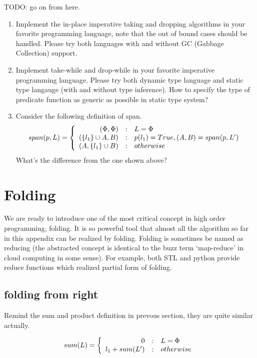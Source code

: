 \documentclass{article}
\begin{document}
TODO: go on from here.

\begin{Exercise}
\begin{enumerate}
\item Implement the in-place imperative taking and dropping algorithms in your favorite programming language, note that
the out of bound cases should be handled. Please try both languages with and without GC (Gabbage Collection) support.
\item Implement take-while and drop-while in your favorite imperative programming language. Please try both dynamic
type language and static type langauge (with and without type inference). How to specify the type of predicate function
as generic as possible in static type system?
\item Consider the following definition of span.
\[
span(p, L) =  \left \{
  \begin{array}
  {r@{\quad:\quad}l}
  (\Phi, \Phi) & L = \Phi \\
  (\{ l_1 \} \cup A, B) & p(l_1) = True, (A, B) = span(p, L') \\
  (A, \{l_1\} \cup B) & otherwise
  \end{array}
\right.
\]
What's the difference from the one shown above?
\end{enumerate}
\end{Exercise}

\section{Folding}

We are ready to introduce one of the most critical concept in high order programming, folding. It is so powerful tool
that almost all the algorithm so far in this appendix can be realized by folding. Folding is sometimes be named as
reducing (the abstracted concept is identical to the buzz term `map-reduce' in cloud computing in some sense). For example,
both STL and python provide reduce functions which realized partial form of folding.

\subsection{folding from right}
Remind the sum and product definition in prevous section, they are quite similar actually.

\[
sum(L) =  \left \{
  \begin{array}
  {r@{\quad:\quad}l}
  0 & L = \Phi \\
  l_1 + sum(L') & otherwise
  \end{array}
\right.
\]
\end{document}

